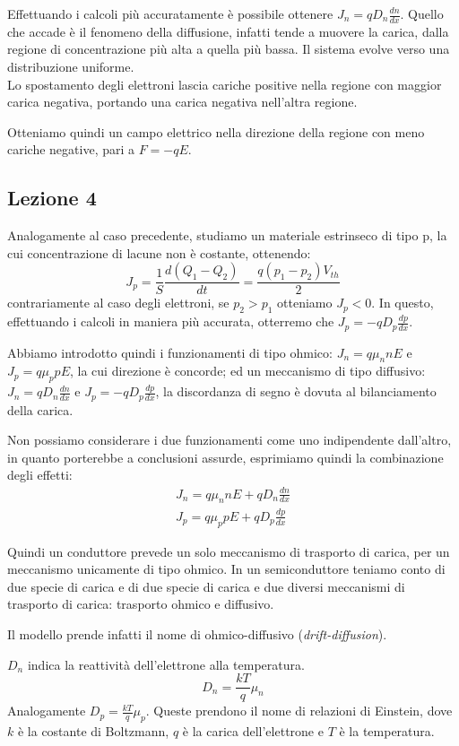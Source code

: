 \documentclass[../template]{subfiles}
\begin{document}
Effettuando i calcoli più accuratamente è possibile ottenere $J_n = q D_n \frac{dn}{dx}$. Quello che accade è il fenomeno della diffusione, infatti tende a muovere la carica, dalla regione di concentrazione più alta a quella più bassa. Il sistema evolve verso una distribuzione uniforme.
\\
Lo spostamento degli elettroni lascia cariche positive nella regione con maggior carica negativa, portando una carica negativa nell'altra regione.

Otteniamo quindi un campo elettrico nella direzione della regione con meno cariche negative, pari a $F = -qE$.

\subsection{Lezione 4}
Analogamente al caso precedente, studiamo un materiale estrinseco di tipo p, la cui concentrazione di lacune non è costante, ottenendo:
\[
    J_p = \frac{1}{S}\frac{d(Q_1 - Q_2)}{dt} = \frac{q(p_1 - p_2) V_{th}}{2}
\]
contrariamente al caso degli elettroni, se $p_2 > p_1$ otteniamo $J_p < 0$.
In questo, effettuando i calcoli in maniera più accurata, otterremo che $J_p = -qD_p \frac{dp}{dx}$.

Abbiamo introdotto quindi i funzionamenti di tipo ohmico: $J_n = q\mu_n n E$ e $J_p = q \mu_p p E$, la cui direzione è concorde;
ed un meccanismo di tipo diffusivo: $J_n = q D_n \frac{dn}{dx}$ e $J_p = -qD_p \frac{dp}{dx}$, la discordanza di segno è dovuta al bilanciamento della carica.

Non possiamo considerare i due funzionamenti come uno indipendente dall'altro, in quanto porterebbe a conclusioni assurde, esprimiamo quindi la combinazione degli effetti:
\begin{align*}
    J_n = q \mu_n n E + q D_n \frac{dn}{dx} \\
    J_p = q \mu_p p E + q D_p \frac{dp}{dx}
\end{align*}

Quindi un conduttore prevede un solo meccanismo di trasporto di carica, per un meccanismo unicamente di tipo ohmico. In un semiconduttore teniamo conto di due specie di carica e di due specie di carica e due diversi meccanismi di trasporto di carica: trasporto ohmico e diffusivo.

Il modello prende infatti il nome di ohmico-diffusivo (\textit{drift-diffusion}).

$D_n$ indica la reattività dell'elettrone alla temperatura.
\[
    D_n = \frac{kT}{q} \mu_n
\]
Analogamente $D_p = \frac{kT}{q}\mu_p$. Queste prendono il nome di relazioni di Einstein, dove $k$ è la costante di Boltzmann, $q$ è la carica dell'elettrone e $T$ è la temperatura.
\end{document}
